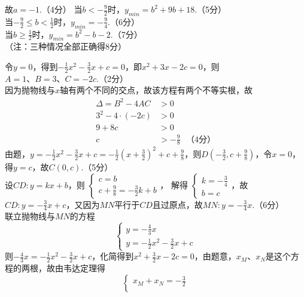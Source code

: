 \documentclass[10pt]{article}
\begin{document}
\begin{questions}{\answeringintroduction}
\begin{subquestions}
        故$a=-1$.（4分）
        \subquestion 当$b < -\frac{9}{2}$时，$y_{min} = b^2+9b+18$.（5分） \\
        当$-\frac{9}{2} \leq b < \frac{1}{2}$时，$y_{min} = -\frac{9}{4}$.（6分） \\
        当$b \geq \frac{1}{2}$时，$y_{min} = b^2-b-2$.（7分） \\
        （注：三种情况全部正确得8分）
    \end{subquestions}
    \question %
    \begin{subquestions}
        \subquestion 令$y=0$，得到$-\frac{1}{2}x^2-\frac{3}{2}x+c=0$，即$x^2+3x-2c=0$，则$A=1、B=3、C=-2c$.（2分） \\
        因为抛物线与$x$轴有两个不同的交点，故该方程有两个不等实根，故
        $$\begin{aligned}
            \Delta = B^2 - 4AC &> 0 \\
            3^2 - 4 \cdot (-2c) &> 0 \\
            9 + 8c &> 0 \\
            c &> -\frac{9}{8} \ \ \ （4分）
        \end{aligned}$$
        \subquestion 由题，$y=-\frac{1}{2}x^2-\frac{3}{2}x+c=-\frac{1}{2}\left(x+\frac{3}{2}\right)^2+c+\frac{9}{8}$，则$D\left(-\frac{3}{2},c+\frac{9}{8}\right)$，令$x=0$，得$y=c$，故$C(0,c)$.（5分） \\
        设$CD:y=kx+b$，则
        $\begin{cases}
            c = b \\
            c + \frac{9}{8} = -\frac{3}{2}k + b
        \end{cases}$，
        解得
        $\begin{cases}
            k = -\frac{3}{4} \\
            b = c
        \end{cases}$，故$CD:y=-\frac{3}{4}x+c$，又因为$MN$平行于$CD$且过原点，故$MN:y=-\frac{3}{4}x$.（6分） \\
        联立抛物线与$MN$的方程
        $$\begin{cases}
            y = -\frac{4}{3}x \\
            y = -\frac{1}{2}x^2-\frac{3}{2}x+c
        \end{cases}$$
        则$-\frac{4}{3}x = -\frac{1}{2}x^2-\frac{3}{2}x+c$，化简得到$x^2+\frac{3}{2}x-2c=0$，由题意，$x_M$、$x_N$是这个方程的两根，故由韦达定理得
        $$\begin{cases}
            x_M + x_N = -\frac{3}{2} \\

\end{cases}$$
\end{subquestions}
\end{questions}
\end{document}
